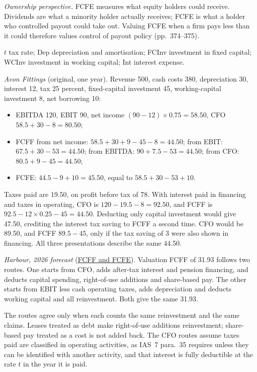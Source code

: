 \begin{qfmethod}
\emph{Ownership perspective.} FCFE measures what equity holders could receive. Dividends are what a minority holder actually receives; FCFE is what a holder who controlled payout could take out. Valuing FCFE when a firm pays less than it could therefore values control of payout policy (pp.~374--375).

 $t$ tax rate; Dep depreciation and amortisation; FCInv investment in fixed capital; WCInv investment in working capital; Int interest expense.

 \emph{Avon Fittings} (original, one year). Revenue 500, cash costs 380, depreciation 30, interest 12, tax 25 percent, fixed-capital investment 45, working-capital investment 8, net borrowing 10:
\begin{itemize}
\item EBITDA 120, EBIT 90, net income $(90-12)\times0.75=58.50$, CFO $58.5+30-8=80.50$;
\item FCFF from net income: $58.5+30+9-45-8=44.50$; from EBIT: $67.5+30-53=44.50$; from EBITDA: $90+7.5-53=44.50$; from CFO: $80.5+9-45=44.50$;
\item FCFE: $44.5-9+10=45.50$, equal to $58.5+30-53+10$.
\end{itemize}
Taxes paid are 19.50, on profit before tax of 78. With interest paid in financing and taxes in operating, CFO is $120-19.5-8=92.50$, and FCFF is $92.5-12\times0.25-45=44.50$. Deducting only capital investment would give 47.50, crediting the interest tax saving to FCFF a second time. CFO would be 89.50, and FCFF $89.5-45$, only if the tax saving of 3 were also shown in financing. All three presentations describe the same 44.50.

\emph{Harbour, 2026 forecast} (\hyperref[meth:free-cash-flow-coverage]{FCFF and FCFE}). Valuation FCFF of 31.93 follows two routes. One starts from CFO, adds after-tax interest and pension financing, and deducts capital spending, right-of-use additions and share-based pay. The other starts from EBIT less cash operating taxes, adds depreciation and deducts working capital and all reinvestment. Both give the same 31.93.

 The routes agree only when each counts the same reinvestment and the same claims. Leases treated as debt make right-of-use additions reinvestment; share-based pay treated as a cost is not added back. The CFO routes assume taxes paid are classified in operating activities, as IAS~7 para.~35 requires unless they can be identified with another activity, and that interest is fully deductible at the rate $t$ in the year it is paid.


\end{qfmethod}
